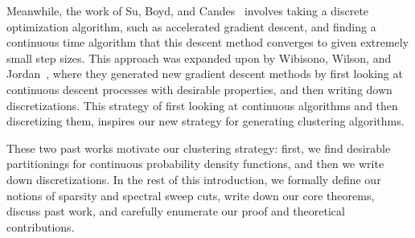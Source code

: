 Meanwhile, the work of Su, Boyd, and Candes~\cite{SuNesterov14} involves taking a
discrete optimization algorithm, such as accelerated gradient descent, and
finding a continuous time algorithm that this descent method converges
to given extremely small step sizes.  This approach was expanded
upon by Wibisono, Wilson, and Jordan~\cite{WibisonoGradient16}, where they generated new
gradient descent methods by first looking at continuous descent
processes with desirable properties,
and then writing down discretizations. This strategy of first looking at
continuous algorithms and then discretizing them, inspires our new
strategy for generating clustering algorithms.

These two past works motivate our clustering strategy: first, we find
desirable partitionings for continuous probability density functions, and then we
write down discretizations. In the rest of this introduction, we
formally define our notions of sparsity and spectral sweep cuts,
write down our core theorems, discuss past work, and carefully enumerate
our proof and theoretical contributions.

